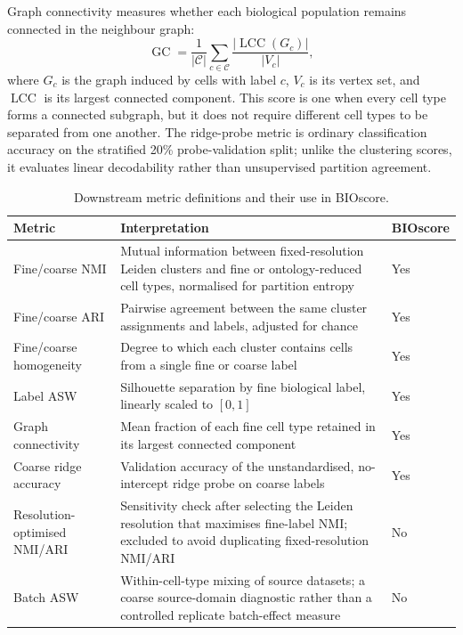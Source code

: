 \documentclass[11pt]{article}
\begin{document}
Graph connectivity measures whether each biological population remains connected in the neighbour graph:
\begin{equation}
\operatorname{GC}=\frac{1}{|\mathcal{C}|}
\sum_{c\in\mathcal{C}}
\frac{|\operatorname{LCC}(G_c)|}{|V_c|},
\end{equation}
where \(G_c\) is the graph induced by cells with label \(c\), \(V_c\) is its vertex set, and \(\operatorname{LCC}\) is its largest connected component.
This score is one when every cell type forms a connected subgraph, but it does not require different cell types to be separated from one another.
The ridge-probe metric is ordinary classification accuracy on the stratified 20\% probe-validation split; unlike the clustering scores, it evaluates linear decodability rather than unsupervised partition agreement.

\begin{table}[ht]
\centering
\caption{Downstream metric definitions and their use in BIOscore.}
\label{tab:supp-metric-definitions}
\small
\begin{tabular}{p{}p{}p{}}
\toprule
Metric & Interpretation & BIOscore \\
\midrule
Fine/coarse NMI & Mutual information between fixed-resolution Leiden clusters and fine or ontology-reduced cell types, normalised for partition entropy & Yes \\
Fine/coarse ARI & Pairwise agreement between the same cluster assignments and labels, adjusted for chance & Yes \\
Fine/coarse homogeneity & Degree to which each cluster contains cells from a single fine or coarse label & Yes \\
Label ASW & Silhouette separation by fine biological label, linearly scaled to $[0,1]$ & Yes \\
Graph connectivity & Mean fraction of each fine cell type retained in its largest connected component & Yes \\
Coarse ridge accuracy & Validation accuracy of the unstandardised, no-intercept ridge probe on coarse labels & Yes \\
Resolution-optimised NMI/ARI & Sensitivity check after selecting the Leiden resolution that maximises fine-label NMI; excluded to avoid duplicating fixed-resolution NMI/ARI & No \\
Batch ASW & Within-cell-type mixing of source datasets; a coarse source-domain diagnostic rather than a controlled replicate batch-effect measure & No \\
\bottomrule
\end{tabular}
\end{table}
\end{document}
